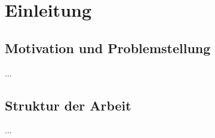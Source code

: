 \chapter{Einleitung}
\label{sec:Einleitung}

\section{Motivation und Problemstellung}
\label{sec:Motivation und Problemstellung}

...

\section{Struktur der Arbeit}
\label{sec:Struktur der Arbeit}

...



